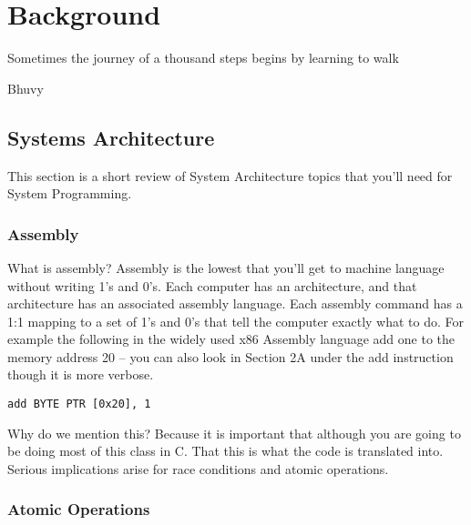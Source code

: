\chapter{Background}

\epigraph{Sometimes the journey of a thousand steps begins by learning to walk}{Bhuvy}

\section{Systems Architecture}

This section is a short review of System Architecture topics that you'll need for System Programming.

\subsection{Assembly}

What is assembly? Assembly is the lowest that you'll get to machine language without writing 1's and 0's.
Each computer has an architecture, and that architecture has an associated assembly language.
Each assembly command has a 1:1 mapping to a set of 1's and 0's that tell the computer exactly what to do.
For example the following in the widely used x86 Assembly language add one to the memory address 20 \cite{wiki:xxx} -- you can also look in \cite{guide2011intel} Section 2A under the add instruction though it is more verbose.

\begin{lstlisting}
add BYTE PTR [0x20], 1
\end{lstlisting}

Why do we mention this? Because it is important that although you are going to be doing most of this class in C.
That this is what the code is translated into.
Serious implications arise for race conditions and atomic operations.

\subsection{Atomic Operations}

